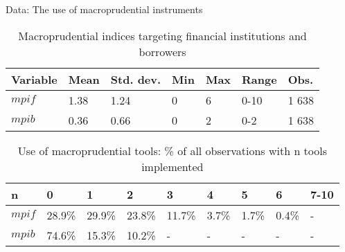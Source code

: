 \documentclass{beamer}
\begin{document}
\begin{frame}{Data: The use of macroprudential instruments}
\begin{table}[!h]
\centering
\begin{tabular}{ l l l l l l l }
\hline
Variable&Mean&Std. dev.&Min&Max&Range&Obs. \\
\hline
$mpif$&1.38&1.24&0&6&0-10&1 638 \\
$mpib$&0.36&0.66&0&2&0-2&1 638 \\
\hline
\end{tabular}
\caption{Macroprudential indices targeting financial institutions and borrowers}
\label{tab:mpi}
\end{table}

\begin{table}[!h]
\small
\centering
\begin{tabular}{ l l l l l l l l l }
\hline
n&0&1&2&3&4&5&6&7-10\\
\hline
$mpif$&28.9\%&29.9\%&23.8\%&11.7\%&3.7\%&1.7\%&0.4\%&- \\
$mpib$&74.6\%&15.3\%&10.2\%&-&-&-&-&- \\
\hline
\end{tabular}
\caption{Use of macroprudential tools: \% of all observations with n tools implemented}
\label{tab:mpiu_use}
\end{table}
\end{frame}

\end{document}
